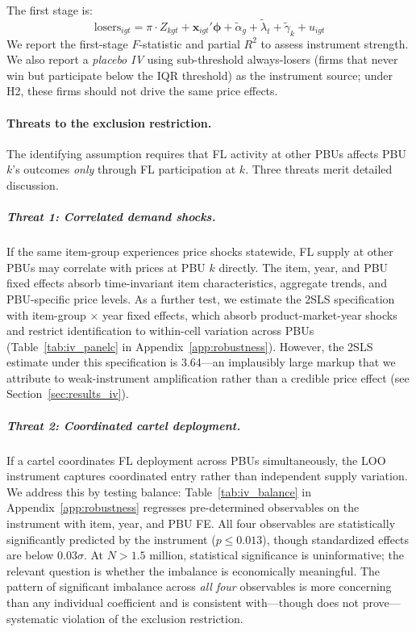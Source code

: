 The first stage is:
\begin{equation}
  \text{losers}_{igt} = \pi \cdot Z_{kgt} + \mathbf{x}_{igt}'
  \boldsymbol{\phi} + \tilde{\alpha}_g + \tilde{\lambda}_t +
  \tilde{\gamma}_k + u_{igt}
  \label{eq:first_stage}
\end{equation}
We report the first-stage $F$-statistic and partial $R^2$ to assess
instrument strength. We also report a \emph{placebo IV} using
sub-threshold always-losers (firms that never win but participate below
the IQR threshold) as the instrument source; under H2, these firms
should not drive the same price effects.

\paragraph{Threats to the exclusion restriction.} %
The identifying assumption requires that FL activity at other PBUs
affects PBU $k$'s outcomes \emph{only} through FL participation at $k$.
Three threats merit detailed discussion.

\subparagraph{Threat 1: Correlated demand shocks.}
If the same item-group experiences price shocks statewide, FL supply at
other PBUs may correlate with prices at PBU $k$ directly. The item,
year, and PBU fixed effects absorb time-invariant item characteristics,
aggregate trends, and PBU-specific price levels. As a further test, we
estimate the 2SLS specification with item-group $\times$ year fixed
effects, which absorb product-market-year shocks and restrict
identification to within-cell variation across PBUs
(Table~\ref{tab:iv_panelc} in Appendix~\ref{app:robustness}). However,
the 2SLS estimate under this specification is 3.64---an implausibly
large markup that we attribute to weak-instrument amplification rather
than a credible price effect (see Section~\ref{sec:results_iv}).

\subparagraph{Threat 2: Coordinated cartel deployment.}
If a cartel coordinates FL deployment across PBUs simultaneously, the
LOO instrument captures coordinated entry rather than independent supply
variation. We address this by testing balance:
Table~\ref{tab:iv_balance} in Appendix~\ref{app:robustness} regresses
pre-determined observables on the instrument with item, year, and PBU
FE. All four observables are statistically significantly predicted by
the instrument ($p \leq 0.013$), though standardized effects are below
$0.03\sigma$. At $N > 1.5$ million, statistical significance is
uninformative; the relevant question is whether the imbalance is
economically meaningful. The pattern of significant imbalance across
\emph{all four} observables is more concerning than any individual
coefficient and is consistent with---though does not prove---systematic
violation of the exclusion restriction.

